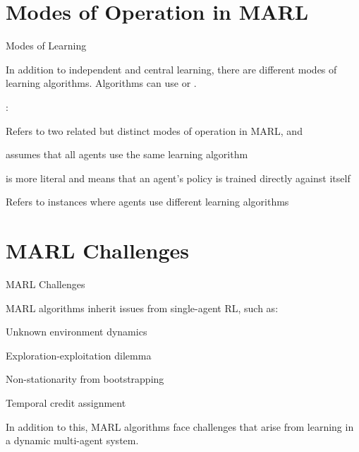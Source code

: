 \section{Modes of Operation in MARL}

\begin{frame}{Modes of Learning}

In addition to independent and central learning, there are different modes of learning algorithms. Algorithms can use  or .

:

\blist
    \item Refers to two related but distinct modes of operation in MARL,  and 
    \item {} assumes that all agents use the same learning algorithm
    \item {} is more literal and means that an agent's policy is trained directly against itself
\elist


\blist
    \item Refers to instances where agents use different learning algorithms
\elist
    
\end{frame}

\section{MARL Challenges}

\begin{frame}[t]{MARL Challenges}

MARL algorithms inherit issues from single-agent RL, such as:

\blist
    \item Unknown environment dynamics
    \item Exploration-exploitation dilemma
    \item Non-stationarity from bootstrapping
    \item Temporal credit assignment
\elist

In addition to this, MARL algorithms face challenges that arise from learning in a dynamic multi-agent system.
    
\end{frame}

